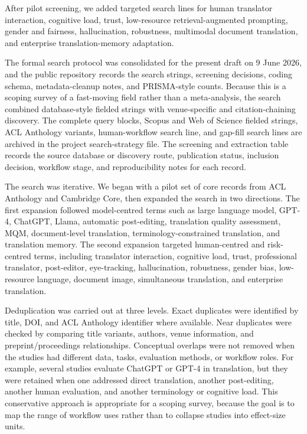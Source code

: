\documentclass[11pt]{article}
\begin{document}
After pilot screening, we added targeted search lines for human translator interaction, cognitive load, trust, low-resource retrieval-augmented prompting, gender and fairness, hallucination, robustness, multimodal document translation, and enterprise translation-memory adaptation.

The formal search protocol was consolidated for the present draft on 9 June 2026, and the public repository records the search strings, screening decisions, coding schema, metadata-cleanup notes, and PRISMA-style counts. Because this is a scoping survey of a fast-moving field rather than a meta-analysis, the search combined database-style fielded strings with venue-specific and citation-chaining discovery. The complete query blocks, Scopus and Web of Science fielded strings, ACL Anthology variants, human-workflow search line, and gap-fill search lines are archived in the project search-strategy file. The screening and extraction table records the source database or discovery route, publication status, inclusion decision, workflow stage, and reproducibility notes for each record.

The search was iterative. We began with a pilot set of core records from ACL Anthology and Cambridge Core, then expanded the search in two directions. The first expansion followed model-centred terms such as large language model, GPT-4, ChatGPT, Llama, automatic post-editing, translation quality assessment, MQM, document-level translation, terminology-constrained translation, and translation memory. The second expansion targeted human-centred and risk-centred terms, including translator interaction, cognitive load, trust, professional translator, post-editor, eye-tracking, hallucination, robustness, gender bias, low-resource language, document image, simultaneous translation, and enterprise translation.

Deduplication was carried out at three levels. Exact duplicates were identified by title, DOI, and ACL Anthology identifier where available. Near duplicates were checked by comparing title variants, authors, venue information, and preprint/proceedings relationships. Conceptual overlaps were not removed when the studies had different data, tasks, evaluation methods, or workflow roles. For example, several studies evaluate ChatGPT or GPT-4 in translation, but they were retained when one addressed direct translation, another post-editing, another human evaluation, and another terminology or cognitive load. This conservative approach is appropriate for a scoping survey, because the goal is to map the range of workflow uses rather than to collapse studies into effect-size units.
\end{document}
